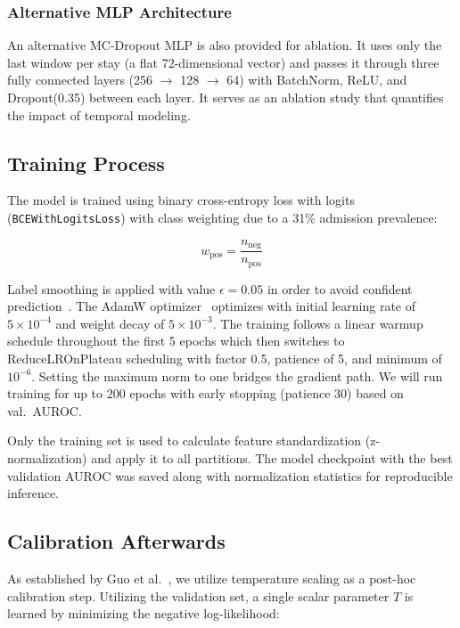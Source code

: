 \documentclass[runningheads]{llncs}
\begin{document}
\subsubsection{Alternative MLP Architecture}
An alternative MC-Dropout MLP is also provided for ablation. It uses only the last window per stay (a flat 72-dimensional vector) and passes it through three fully connected layers (256 $\rightarrow$ 128 $\rightarrow$ 64) with BatchNorm, ReLU, and Dropout(0.35) between each layer. It serves as an ablation study that quantifies the impact of temporal modeling.

\subsection{Training Process}

The model is trained using binary cross-entropy loss with logits (\texttt{BCEWithLogitsLoss}) with class weighting due to a 31\% admission prevalence:

\begin{equation}
w_{\text{pos}} = \frac{n_{\text{neg}}}{n_{\text{pos}}}
\end{equation}

Label smoothing is applied with value $\epsilon = 0.05$ in order to avoid confident prediction~\cite{Muller2019}. The AdamW optimizer~\cite{Loshchilov2019} optimizes with initial learning rate of $5 \times 10^{-4}$ and weight decay of $5 \times 10^{-3}$. The training follows a linear warmup schedule throughout the first 5 epochs which then switches to ReduceLROnPlateau scheduling with factor 0.5, patience of 5, and minimum of $10^{-6}$. Setting the maximum norm to one bridges the gradient path. We will run training for up to 200 epochs with early stopping (patience 30) based on val.\ AUROC.

Only the training set is used to calculate feature standardization (z-normalization) and apply it to all partitions. The model checkpoint with the best validation AUROC was saved along with normalization statistics for reproducible inference.

\subsection{Calibration Afterwards}

As established by Guo et al.~\cite{Guo2017}, we utilize temperature scaling as a post-hoc calibration step. Utilizing the validation set, a single scalar parameter $T$ is learned by minimizing the negative log-likelihood:
\end{document}
